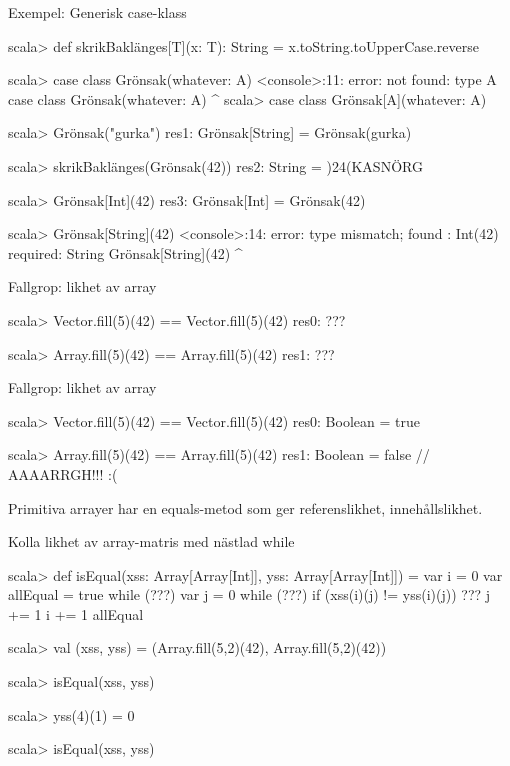 \begin{Slide}{Exempel: Generisk case-klass}
\vspace{-0.5em}\begin{REPL}
scala> def skrikBaklänges[T](x: T): String = x.toString.toUpperCase.reverse

scala> case class Grönsak(whatever: A)
<console>:11: error: not found: type A
       case class Grönsak(whatever: A)
                                    ^
scala> case class Grönsak[A](whatever: A)

scala> Grönsak("gurka")
res1: Grönsak[String] = Grönsak(gurka)

scala> skrikBaklänges(Grönsak(42))
res2: String = )24(KASNÖRG

scala> Grönsak[Int](42)
res3: Grönsak[Int] = Grönsak(42)

scala> Grönsak[String](42)
<console>:14: error: type mismatch;
 found   : Int(42)
 required: String
       Grönsak[String](42)
                       ^
\end{REPL}
\end{Slide}

\ifkompendium\else
\begin{Slide}{Fallgrop: likhet av array}
\begin{REPL}
scala> Vector.fill(5)(42) == Vector.fill(5)(42)
res0: ???

scala> Array.fill(5)(42) == Array.fill(5)(42)
res1: ???
\end{REPL}
\end{Slide}
\fi

\begin{Slide}{Fallgrop: likhet av array}
\begin{REPL}
scala> Vector.fill(5)(42) == Vector.fill(5)(42)
res0: Boolean = true

scala> Array.fill(5)(42) == Array.fill(5)(42)
res1: Boolean = false  // AAAARRGH!!! :(
\end{REPL}
Primitiva arrayer har en equals-metod som ger referenslikhet,  innehållslikhet.
\end{Slide}

\ifkompendium\else
\begin{Slide}{Kolla likhet av array-matris med nästlad while}
\begin{REPL}
scala> def isEqual(xss: Array[Array[Int]], yss: Array[Array[Int]]) = {
         var i = 0
         var allEqual = true
         while (???) {
           var j = 0
           while (???) {
             if (xss(i)(j) != yss(i)(j)) ???
             j += 1
           }
           i += 1
         }
         allEqual
       }

scala> val (xss, yss) = (Array.fill(5,2)(42), Array.fill(5,2)(42))

scala> isEqual(xss, yss)

scala> yss(4)(1) = 0

scala> isEqual(xss, yss)
\end{REPL}
\end{Slide}
\fi


